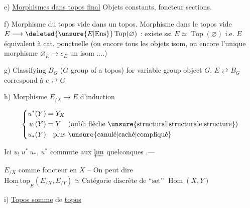 e) \uline{Morphismes dans topos final}  Objets constants, foncteur sections.

f) Morphisme du topos vide dans un topos. Morphisme dans le topos vide $E\longrightarrow\deleted{\unsure{E|\mathrm{Ens}}}\operatorname{Top}(\varnothing)$  : existe ssi $E\simeq\operatorname{Top}(\varnothing)$ i.e. $E$ équivalent à cat. ponctuelle (ou encore tous les objets isom, ou encore l'unique morphisme $\varnothing_E\to e_E$ un isom ....)

g) Classifying $B_G$ ($G$ group of a topos) for variable group object $G$. $E\rightleftarrows B_G$ correspond à $e\rightleftarrows G$

h) Morphisme $E_{/X}\longrightarrow E$ \uline{d'induction}



\[\left\{\begin{aligned}u^*(Y)&=Y_X\\u_!(Y)&=Y\quad(\text{oubli flèche \unsure{structural|structurale|structure}})\\u_*(Y)&\quad\text{plus \unsure{canulé|caché|compliqué}}\end{aligned}\right.\]

Ici  $u_!\ u^*\ u_*$, $u^*$ commute aux $\varprojlim$ quelconques .---

$E_{/X}$ \deleted{\unsure{--}} comme foncteur en $X$ -- On peut dire $\underline{\mathrm{Hom\,top}}_E(E_{/X},E_{/Y})\simeq\text{Catégorie discrète de ``set'' }\operatorname{Hom}(X,Y)$

i) \uline{Topos somme} de \uline{topos}
